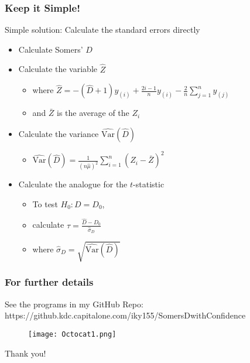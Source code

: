 \documentclass{beamer}
\begin{document}
\begin{frame}
\frametitle{Keep it Simple!}

Simple solution: Calculate the standard errors directly

\begin{itemize}
    \item Calculate Somers' $D$
    \item Calculate the variable $\hat{Z}$
    \begin{itemize}
        \item where $\hat{Z} = - (\hat{D} + 1) y_{(i)} + \frac{2i - 1}{n} y_{(i)} - \frac{2}{n} \sum_{j = 1}^{n} y_{(j)}$
        \item and $\bar{Z}$ is the average of the $Z_i$
    \end{itemize}
    \item Calculate the variance $\hat{\mathrm{Var}}(\hat{D})$
    \begin{itemize}
        \item $\hat{\mathrm{Var}}(\hat{D}) = \frac{1}{(n\hat{\mu})^2} \sum_{i = 1}^{n}(\hat{Z}_i - \bar{Z})^2$
    \end{itemize}
    \item Calculate the analogue for the $t$-statistic
    \begin{itemize}
        \item To test $H_0: D = D_0$,
        \item calculate $\tau = \frac{\hat{D} - D_0}{\hat{\sigma}_D}$
        \item where $\hat{\sigma}_D = \sqrt{\hat{\mathrm{Var}}(\hat{D})}$
    \end{itemize}
\end{itemize}

\end{frame}


\begin{frame}
\frametitle{For further details}

See the programs in my GitHub Repo: \\
https://github.kdc.capitalone.com/iky155/SomersDwithConfidence
\begin{figure}
    \texttt{[image: Octocat1.png]}
\end{figure}
Thank you!

\end{frame}


\end{document}

